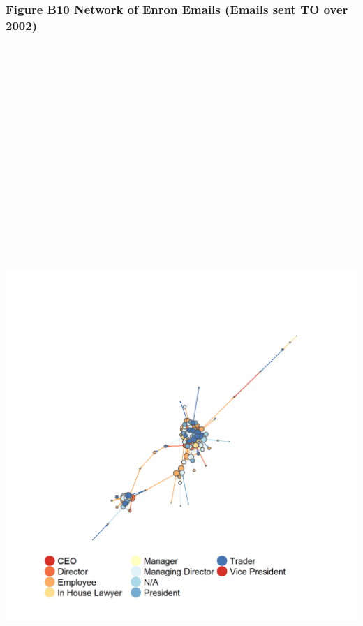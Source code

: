 \documentclass[]{article}
\begin{document}
\newpage

\subsubsection{Figure B10 Network of Enron Emails (Emails sent TO over
2002)}\label{figure-b10-network-of-enron-emails-emails-sent-to-over-2002}

\section{\texorpdfstring{\protect\includegraphics[height=12.50000in]{images/n_to_02.png}}{Network of Enron Emails}}\label{network-of-enron-emails-7}
\end{document}
